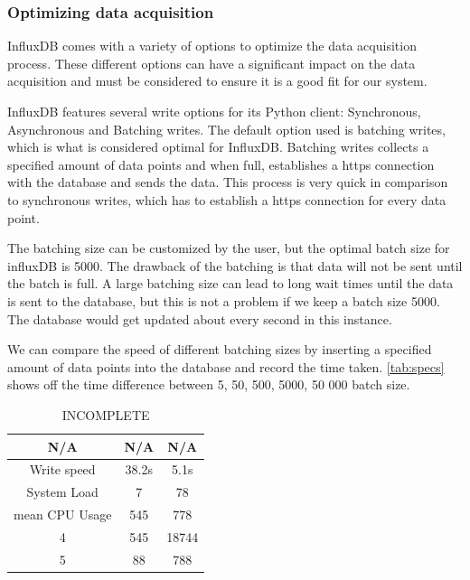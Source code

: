 \documentclass[main.tex]{subfiles}
\begin{document}


\subsubsection{Optimizing data acquisition}

InfluxDB comes with a variety of options to optimize the data acquisition process. These different options can have a significant impact on the data acquisition and must be considered to ensure it is a good fit for our system.

InfluxDB features several write options for its Python client: Synchronous, Asynchronous and Batching writes. The default option used is batching writes, which is what is considered optimal for InfluxDB. Batching writes collects a specified amount of data points and when full, establishes a https connection with the database and sends the data. This process is very quick in comparison to synchronous writes, which has to establish a https connection for every data point.

The batching size can be customized by the user, but the optimal batch size for influxDB is 5000\cite{influx_batching}. The drawback of the batching is that data will not be sent until the batch is full. A large batching size can lead to long wait times until the data is sent to the database, but this is not a problem if we keep a batch size 5000. The database would get updated about every second in this instance.

We can compare the speed of different batching sizes by inserting a specified amount of data points into the database and record the time taken. \autoref{tab:specs} shows off the time difference between 5, 50, 500, 5000, 50 000 batch size.

\begin{table}[h]
\centering
\begin{tabular}{||c c c||} 
 \hline
 N/A & N/A & N/A \\ [0.5ex] 
 \hline\hline
 Write speed & 38.2s & 5.1s \\ 
 \hline
 System Load & 7 & 78  \\
 \hline
 mean CPU Usage & 545 & 778 \\
 \hline
 4 & 545 & 18744\\
 \hline
 5 & 88 & 788\\ [1ex] 
 \hline

\end{tabular}
\caption{\label{tab:specs} INCOMPLETE}
\end{table}
\FloatBarrier
\end{document}
